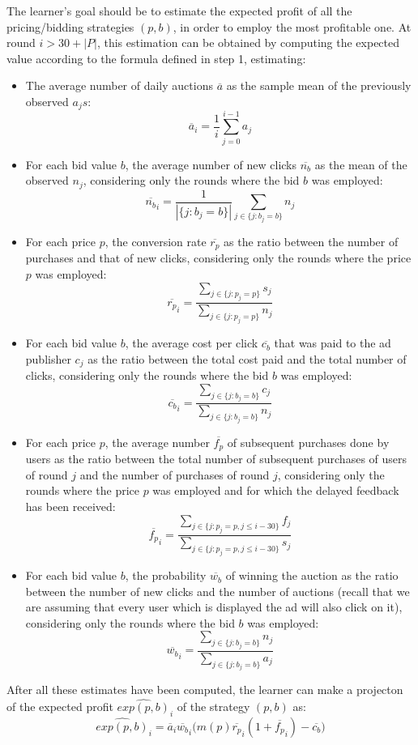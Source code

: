 \documentclass[11pt]{article} %
\begin{document}
The learner's goal should be to estimate the expected profit of all the pricing/bidding strategies $(p,b)$, in order to employ the most profitable one. At round $i>30+|P|$, this estimation can be obtained by computing the expected value according to the formula defined in step 1, estimating:
\begin{itemize}
\item The average number of daily auctions $\overline a$ as the sample mean of the previously observed $a_js$: \[\overline a_i=\frac{1}{i}\sum_{j=0}^{i-1}{a_j}\]
\item For each bid value $b$, the average number of new clicks  $\overline{n_b}$ as the mean of the observed $n_j$, considering only the rounds where the bid $b$ was employed: \[\overline{n_b}_i=\frac{1}{|\{j: b_j=b\}|}\sum_{j\in\{j: b_j=b\}}{n_j}\]
\item For each price $p$, the conversion rate $\overline{r_p}$ as the ratio between the number of purchases and that of new clicks, considering only the rounds where the price $p$ was employed: \[\overline{r_p}_i=\frac{\sum_{j\in\{j:p_j=p\}}{s_j}}{\sum_{j\in\{j:p_j=p\}}{n_j}}\]
\item For each bid value $b$, the average cost per click $\overline{c_b}$ that was paid to the ad publisher $c_j$ as the ratio between the total cost paid and the total number of clicks,  considering only the rounds where the bid $b$ was employed:  \[\overline{c_b}_i=\frac{\sum_{j\in\{j:b_j=b\}}{c_j}}{\sum_{j\in\{j:b_j=b\}}{n_j}}\]
\item For each price $p$, the average number $\overline{f_p}$ of subsequent purchases done by users as the ratio between the total number of subsequent purchases of users of round $j$ and the number of purchases of round $j$, considering only the rounds where the price $p$ was employed and for which the delayed feedback has been received: \[\overline{f_p}_i=\frac{\sum_{j\in\{j:p_j=p, j\le i-30\}}{f_j}}{\sum_{j\in\{j:p_j=p, j\le i-30\}}{s_j}}\]
\item For each bid value $b$, the probability $\overline{w_b}$ of winning the auction as the ratio between the number of new clicks and the number of auctions {\color{red}(recall that we are assuming that every user which is displayed the ad will also click on it)}, considering only the rounds where the bid $b$ was employed:  \[\overline{w_b}_i=\frac{\sum_{j\in\{j:b_j=b\}}{n_j}}{\sum_{j\in\{j:b_j=b\}}{a_j}}\]
\end{itemize}
After all these estimates have been computed, the learner can make a projecton of the expected profit $\widehat{exp(p,b)}_i$ of the strategy $(p,b)$ as: \[\widehat{exp(p,b)}_i=\overline{a}_i\overline{w_b}_i\bigg(m(p)\overline{r_p}_i(1+\overline{f_p}_i) -\overline{c_b} \bigg) \]
\end{document}
